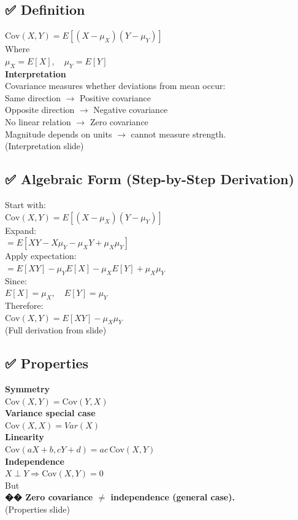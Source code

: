 \documentclass{article}
\begin{document}
\subsection{✅ Definition}
$\text{Cov}(X,Y)=E[(X-\mu_X)(Y-\mu_Y)]$ \\
Where \\
$\mu_X=E[X],\quad \mu_Y=E[Y]$ \\
\textbf{Interpretation} \\
Covariance measures whether deviations from mean occur: \\
Same direction $\rightarrow$ Positive covariance \\
Opposite direction $\rightarrow$ Negative covariance \\
No linear relation $\rightarrow$ Zero covariance \\
Magnitude depends on units $\rightarrow$ cannot measure strength. \\
(Interpretation slide)

\subsection{✅ Algebraic Form (Step-by-Step Derivation)}
Start with: \\
$\text{Cov}(X,Y)=E[(X-\mu_X)(Y-\mu_Y)]$ \\
Expand: \\
$=E[XY-X\mu_Y-\mu_XY+\mu_X\mu_Y]$ \\
Apply expectation: \\
$=E[XY]-\mu_YE[X]-\mu_XE[Y]+\mu_X\mu_Y$ \\
Since: \\
$E[X]=\mu_X,\quad E[Y]=\mu_Y$ \\
Therefore: \\
$\text{Cov}(X,Y)=E[XY]-\mu_X\mu_Y$ \\
(Full derivation from slide)

\subsection{✅ Properties}
\textbf{Symmetry} \\
$\text{Cov}(X,Y)=\text{Cov}(Y,X)$ \\
\textbf{Variance special case} \\
$\text{Cov}(X,X)=Var(X)$ \\
\textbf{Linearity} \\
$\text{Cov}(aX+b,cY+d)=ac\,\text{Cov}(X,Y)$ \\
\textbf{Independence} \\
$X\perp Y \Rightarrow \text{Cov}(X,Y)=0$ \\
But \\
\textbf{�� Zero covariance $\neq$ independence (general case).} \\
(Properties slide)
\end{document}
